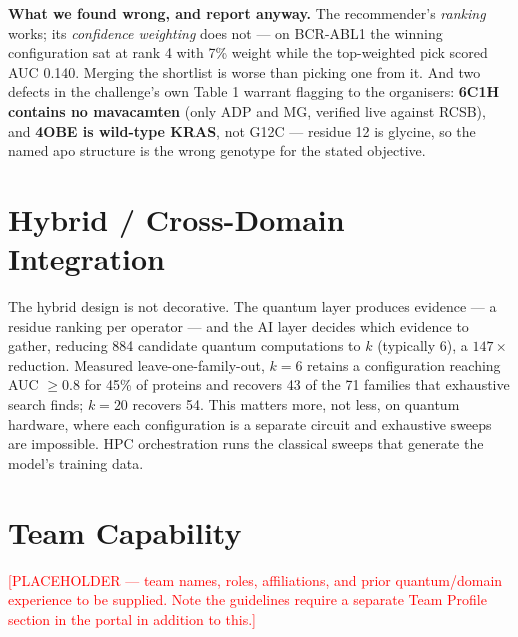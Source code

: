 \documentclass[10pt,a4paper,twocolumn]{article}
\begin{document}
\textbf{What we found wrong, and report anyway.} The recommender's \emph{ranking} works; its
\emph{confidence weighting} does not --- on BCR-ABL1 the winning configuration sat at rank 4 with
7\% weight while the top-weighted pick scored AUC 0.140. Merging the shortlist is worse than
picking one from it. And two defects in the challenge's own Table 1 warrant flagging to the
organisers: \textbf{6C1H contains no mavacamten} (only ADP and MG, verified live against RCSB), and
\textbf{4OBE is wild-type KRAS}, not G12C --- residue 12 is glycine, so the named apo structure is
the wrong genotype for the stated objective.

\section{Hybrid / Cross-Domain Integration}

The hybrid design is not decorative. The quantum layer produces evidence --- a residue ranking per
operator --- and the AI layer decides which evidence to gather, reducing 884 candidate quantum
computations to $k$ (typically 6), a $147\times$ reduction. Measured leave-one-family-out, $k{=}6$
retains a configuration reaching AUC $\ge0.8$ for 45\% of proteins and recovers 43 of the 71
families that exhaustive search finds; $k{=}20$ recovers 54. This matters more, not less, on
quantum hardware, where each configuration is a separate circuit and exhaustive sweeps are
impossible. HPC orchestration runs the classical sweeps that generate the model's training data.

\section{Team Capability}

\textcolor{red}{[PLACEHOLDER --- team names, roles, affiliations, and prior quantum/domain
experience to be supplied. Note the guidelines require a separate Team Profile section in the
portal in addition to this.]}
\end{document}
